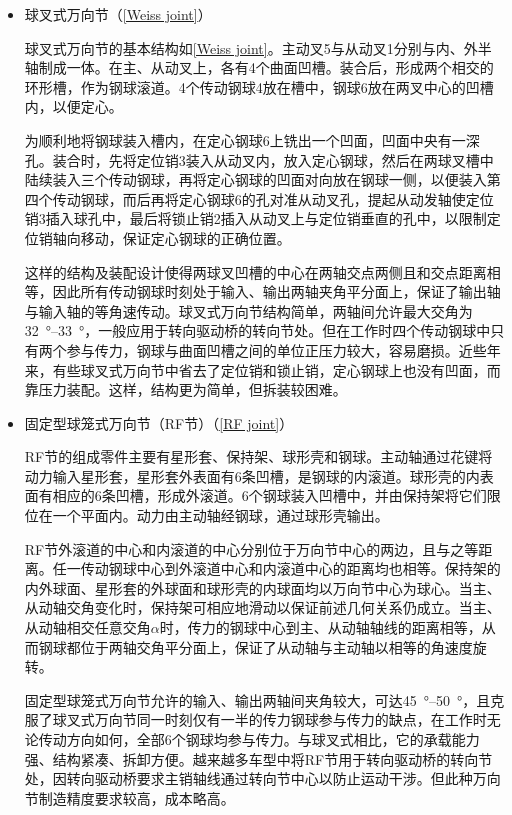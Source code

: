 \documentclass[UTF8]{ctexart}
\numberwithin{figure}{section}
\numberwithin{table}{section}
\begin{document}
\begin{itemize}
	\item 球叉式万向节（\cref{Weiss joint}）

	      球叉式万向节的基本结构如\cref{Weiss joint}。主动叉5与从动叉1分别与内、外半轴制成一体。在主、从动叉上，各有4个曲面凹槽。装合后，形成两个相交的环形槽，作为钢球滚道。4个传动钢球4放在槽中，钢球6放在两叉中心的凹槽内，以便定心。

	      为顺利地将钢球装入槽内，在定心钢球6上铣出一个凹面，凹面中央有一深孔。装合时，先将定位销3装入从动叉内，放入定心钢球，然后在两球叉槽中陆续装入三个传动钢球，再将定心钢球的凹面对向放在钢球一侧，以便装入第四个传动钢球，而后再将定心钢球6的孔对准从动叉孔，提起从动发轴使定位销3插入球孔中，最后将锁止销2插入从动叉上与定位销垂直的孔中，以限制定位销轴向移动，保证定心钢球的正确位置。

	      这样的结构及装配设计使得两球叉凹槽的中心在两轴交点两侧且和交点距离相等，因此所有传动钢球时刻处于输入、输出两轴夹角平分面上，保证了输出轴与输入轴的等角速传动。球叉式万向节结构简单，两轴间允许最大交角为\qtyrange[range-phrase = $\,\sim\,$, range-units = single]{32}{33}{\degree}，一般应用于转向驱动桥的转向节处。但在工作时四个传动钢球中只有两个参与传力，钢球与曲面凹槽之间的单位正压力较大，容易磨损。近些年来，有些球叉式万向节中省去了定位销和锁止销，定心钢球上也没有凹面，而靠压力装配。这样，结构更为简单，但拆装较困难。

	\item 固定型球笼式万向节（RF节）（\cref{RF joint}）

	      RF节的组成零件主要有星形套、保持架、球形壳和钢球。主动轴通过花键将动力输入星形套，星形套外表面有6条凹槽，是钢球的内滚道。球形壳的内表面有相应的6条凹槽，形成外滚道。6个钢球装入凹槽中，并由保持架将它们限位在一个平面内。动力由主动轴经钢球，通过球形壳输出。

	      RF节外滚道的中心和内滚道的中心分别位于万向节中心的两边，且与之等距离。任一传动钢球中心到外滚道中心和内滚道中心的距离均也相等。保持架的内外球面、星形套的外球面和球形壳的内球面均以万向节中心为球心。当主、从动轴交角变化时，保持架可相应地滑动以保证前述几何关系仍成立。当主、从动轴相交任意交角$\alpha$时，传力的钢球中心到主、从动轴轴线的距离相等，从而钢球都位于两轴交角平分面上，保证了从动轴与主动轴以相等的角速度旋转。

	      固定型球笼式万向节允许的输入、输出两轴间夹角较大，可达\qtyrange[range-phrase = $\,\sim\,$, range-units = single]{45}{50}{\degree}，且克服了球叉式万向节同一时刻仅有一半的传力钢球参与传力的缺点，在工作时无论传动方向如何，全部6个钢球均参与传力。与球叉式相比，它的承载能力强、结构紧凑、拆卸方便。越来越多车型中将RF节用于转向驱动桥的转向节处，因转向驱动桥要求主销轴线通过转向节中心以防止运动干涉。但此种万向节制造精度要求较高，成本略高。


\end{itemize}
\end{document}

